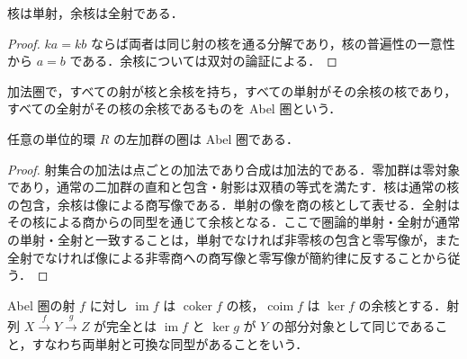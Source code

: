 \begin{prop}[核の単射性と余核の全射性]
核は単射，余核は全射である．
\end{prop}
\begin{proof}
$k a=k b$ ならば両者は同じ射の核を通る分解であり，核の普遍性の一意性から $a=b$ である．余核については双対の論証による．
\end{proof}
\begin{defn}[Abel圏]
加法圏で，すべての射が核と余核を持ち，すべての単射がその余核の核であり，すべての全射がその核の余核であるものを Abel 圏という．
\end{defn}
\begin{prop}[加群の圏のAbel性]
任意の単位的環 $R$ の左加群の圏は Abel 圏である．
\end{prop}
\begin{proof}
射集合の加法は点ごとの加法であり合成は加法的である．零加群は零対象であり，通常の二加群の直和と包含・射影は双積の等式を満たす．核は通常の核の包含，余核は像による商写像である．単射の像を商の核として表せる．全射はその核による商からの同型を通じて余核となる．ここで圏論的単射・全射が通常の単射・全射と一致することは，単射でなければ非零核の包含と零写像が，また全射でなければ像による非零商への商写像と零写像が簡約律に反することから従う．
\end{proof}
\begin{defn}[像と余像及び完全列]
Abel 圏の射 $f$ に対し $\operatorname{im}f$ は $\operatorname{coker}f$ の核，$\operatorname{coim}f$ は $\ker f$ の余核とする．射列 $X\xrightarrow fY\xrightarrow gZ$ が完全とは $\operatorname{im}f$ と $\ker g$ が $Y$ の部分対象として同じであること，すなわち両単射と可換な同型があることをいう．
\end{defn}
